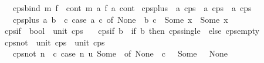 \begin{isabellebody}
\ \ \ {\isachardoublequoteopen}cps{\isacharunderscore}{\kern0pt}bind\ m\ f\ {\isacharequal}{\kern0pt}\ {\isacharparenleft}{\kern0pt}{\isasymlambda}cont{\isachardot}{\kern0pt}\ m\ {\isacharparenleft}{\kern0pt}{\isasymlambda}a{\isachardot}{\kern0pt}\ {\isacharparenleft}{\kern0pt}f\ a{\isacharparenright}{\kern0pt}\ cont{\isacharparenright}{\kern0pt}{\isacharparenright}{\kern0pt}{\isachardoublequoteclose}\isanewline
\isanewline
{}\isamarkupfalse%
\ cps{\isacharunderscore}{\kern0pt}plus\ {\isacharcolon}{\kern0pt}{\isacharcolon}{\kern0pt}\ {\isachardoublequoteopen}{\isacharprime}{\kern0pt}a\ cps\ {\isasymRightarrow}\ {\isacharprime}{\kern0pt}a\ cps\ {\isasymRightarrow}\ {\isacharprime}{\kern0pt}a\ cps{\isachardoublequoteclose}\isanewline
\ \ \ {\isachardoublequoteopen}cps{\isacharunderscore}{\kern0pt}plus\ a\ b\ {\isacharequal}{\kern0pt}\ {\isacharparenleft}{\kern0pt}{\isasymlambda}c{\isachardot}{\kern0pt}\ case\ a\ c\ of\ None\ {\isasymRightarrow}\ b\ c\ {\isacharbar}{\kern0pt}\ Some\ x\ {\isasymRightarrow}\ Some\ x{\isacharparenright}{\kern0pt}{\isachardoublequoteclose}\isanewline
\isanewline
{}\isamarkupfalse%
\ cps{\isacharunderscore}{\kern0pt}if\ {\isacharcolon}{\kern0pt}{\isacharcolon}{\kern0pt}\ {\isachardoublequoteopen}bool\ {\isasymRightarrow}\ unit\ cps{\isachardoublequoteclose}\isanewline
\ \ \ {\isachardoublequoteopen}cps{\isacharunderscore}{\kern0pt}if\ b\ {\isacharequal}{\kern0pt}\ {\isacharparenleft}{\kern0pt}if\ b\ then\ cps{\isacharunderscore}{\kern0pt}single\ {\isacharparenleft}{\kern0pt}{\isacharparenright}{\kern0pt}\ else\ cps{\isacharunderscore}{\kern0pt}empty{\isacharparenright}{\kern0pt}{\isachardoublequoteclose}\isanewline
\isanewline
{}\isamarkupfalse%
\ cps{\isacharunderscore}{\kern0pt}not\ {\isacharcolon}{\kern0pt}{\isacharcolon}{\kern0pt}\ {\isachardoublequoteopen}unit\ cps\ {\isasymRightarrow}\ unit\ cps{\isachardoublequoteclose}\isanewline
\ \ \ {\isachardoublequoteopen}cps{\isacharunderscore}{\kern0pt}not\ n\ {\isacharequal}{\kern0pt}\ {\isacharparenleft}{\kern0pt}{\isasymlambda}c{\isachardot}{\kern0pt}\ case\ n\ {\isacharparenleft}{\kern0pt}{\isasymlambda}u{\isachardot}{\kern0pt}\ Some\ {\isacharbrackleft}{\kern0pt}{\isacharbrackright}{\kern0pt}{\isacharparenright}{\kern0pt}\ of\ None\ {\isasymRightarrow}\ c\ {\isacharparenleft}{\kern0pt}{\isacharparenright}{\kern0pt}\ {\isacharbar}{\kern0pt}\ Some\ {\isacharunderscore}{\kern0pt}\ {\isasymRightarrow}\ None{\isacharparenright}{\kern0pt}{\isachardoublequoteclose}\isanewline

\end{isabellebody}
